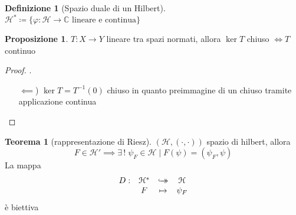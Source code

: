 \documentclass[a4paper,10pt]{article}
\theoremstyle{definition}
\newcommand{\im}{\mathbb{C}} %
\newcommand{\hookdoubleheadrightarrow}{\hookrightarrow\mathrel{\mspace{-15mu}}\rightarrow}
\newcommand{\bij}{\hookdoubleheadrightarrow} %
\newcommand{\hil}{\mathcal{H}} %
\theoremstyle{indentdefinition}
\newtheorem{defn}{Definizione}[section]
\theoremstyle{indenttheorem}
\newtheorem{thm}{Teorema}
\newtheorem{prop}{Proposizione}
\theoremstyle{myremark}
\theoremstyle{indentgeneral}
\newenvironment{myboxed} 
{\noindent\begin{lrbox}{\mybox}\begin{minipage}{\textwidth}}
{\end{minipage}\end{lrbox}\fbox{\usebox{\mybox}}}
\begin{document}
\begin{defn}[Spazio duale di un Hilbert]
    $\hil^*\coloneqq\{\varphi:\hil\to \im\text{ lineare e continua}\}$
\end{defn}

\begin{prop}
    $T:X\to Y$ lineare tra spazi normati, allora $\ker T$ chiuso $\iff T$ continuo 
\end{prop}
\begin{proof}.
    \begin{itemize}
        \item[$\impliedby$)] $\ker T=T^{-1}(0)$ chiuso in quanto preimmagine di un chiuso tramite applicazione continua 
    \end{itemize}
\end{proof}
\begin{myboxed}
\begin{thm}[rappresentazione di Riesz] \label{thm-Riesz} $(\hil,(\cdot,\cdot))$ spazio di hilbert, allora
   $$F\in\hil' \implies\exists \,!\; \psi_F\in \hil\mid F(\psi)=(\psi_F,\psi)$$
   La mappa
   $$\begin{array}{cccc}
     D:& \hil^* & \bij & \hil \\
     & F  & \mapsto & \psi_F 
   \end{array}$$
   è biettiva
\end{thm}
\end{myboxed}
\end{document}

